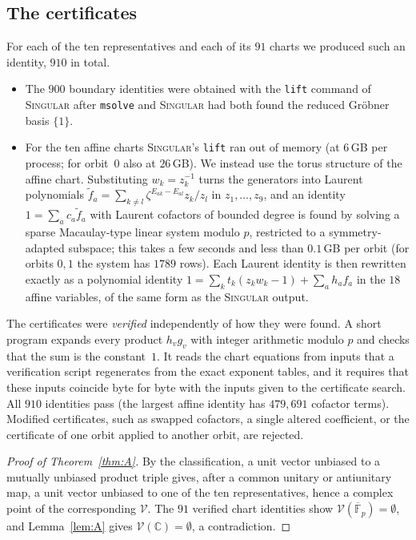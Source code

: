 \documentclass[11pt]{article}
\theoremstyle{definition}
\theoremstyle{remark}
\newcommand{\C}{\mathbb{C}}
\newcommand{\Fp}{\overline{\mathbb{F}}_p}
\begin{document}
\subsection{The certificates}\label{sec:charts}
For each of the ten representatives and each of its $91$ charts we produced such an identity, $910$ in total.
\begin{itemize}[leftmargin=*]
\item The $900$ boundary identities were obtained with the \texttt{lift} command of \textsc{Singular} \cite{Singular}
  after \texttt{msolve} \cite{msolve} and \textsc{Singular} had both found the reduced Gröbner basis $\{1\}$.
\item For the ten affine charts \textsc{Singular}'s \texttt{lift} ran out of memory (at $6$\,GB per process;
  for orbit~$0$ also at $26$\,GB). We instead use the torus
  structure of the affine chart. Substituting $w_k=z_k^{-1}$ turns the generators into Laurent polynomials
  $\tilde f_a=\sum_{k\ne l}\zeta^{E_{ak}-E_{al}}z_k/z_l$ in $z_1,\dots,z_9$, and an identity
  $1=\sum_a c_a\tilde f_a$ with Laurent cofactors of bounded degree is found by solving a sparse Macaulay-type
  linear system modulo $p$, restricted to a symmetry-adapted subspace; this takes a few seconds and less than
  $0.1$\,GB per orbit (for orbits $0,1$ the system has $1789$ rows). Each Laurent identity is then rewritten exactly as a polynomial identity
  $1=\sum_kt_k(z_kw_k-1)+\sum_ah_af_a$ in the $18$ affine variables, of the same form as the \textsc{Singular}
  output.
\end{itemize}
The certificates were \emph{verified} independently of how they were found. A short program expands every product
$h_vg_v$ with integer arithmetic modulo $p$ and checks that the sum is the constant~$1$. It reads the chart equations
from inputs that a verification script regenerates from the exact exponent tables, and it requires that these inputs
coincide byte for byte with the inputs given to the certificate search. All $910$ identities pass (the largest affine
identity has $479{,}691$ cofactor terms). Modified certificates, such as swapped cofactors, a single altered
coefficient, or the certificate of one orbit applied to another orbit, are rejected.

\begin{proof}[Proof of Theorem~\ref{thm:A}]
By the classification, a unit vector unbiased to a mutually unbiased product triple gives, after a common unitary or
antiunitary map, a unit vector unbiased to one of the ten representatives, hence a complex point of the corresponding
$\mathcal V$. The $91$ verified chart identities show $\mathcal V(\Fp)=\emptyset$, and Lemma~\ref{lem:A} gives
$\mathcal V(\C)=\emptyset$, a contradiction.
\end{proof}
\end{document}
